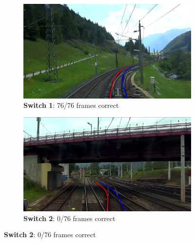 \begin{figure}[H]
    \centering
    \begin{subfigure}[b]{0.48\textwidth}
        \centering
        \includegraphics[width=\textwidth]{PICs/experiments/temporalModels/allesRichtig.png}
        \caption{\textbf{Switch 1}: 76/76 frames correct}
        \label{fig:temporalTestSet_a}
    \end{subfigure}
    \hfill
    \begin{subfigure}[b]{0.48\textwidth}
        \centering
        \includegraphics[width=\textwidth]{PICs/experiments/temporalModels/allesFalsch.png}
        \caption{\textbf{Switch 2}: 0/76 frames correct}
    \end{subfigure}
    
    \vspace{0.5cm} %


\end{figure}
